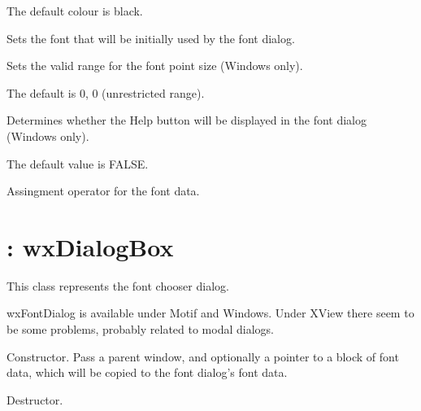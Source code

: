The default colour is black.



Sets the font that will be initially used by the font dialog.



Sets the valid range for the font point size (Windows only).

The default is 0, 0 (unrestricted range).



Determines whether the Help button will be displayed in the font dialog (Windows only).

The default value is FALSE.



Assingment operator for the font data.


\section{: wxDialogBox}\label{wxfontdialog}


This class represents the font chooser dialog.

wxFontDialog is available under Motif and Windows. Under XView there
seem to be some problems, probably related to modal dialogs.



Constructor. Pass a parent window, and optionally a pointer to a block of font
data, which will be copied to the font dialog's font data.



Destructor.


